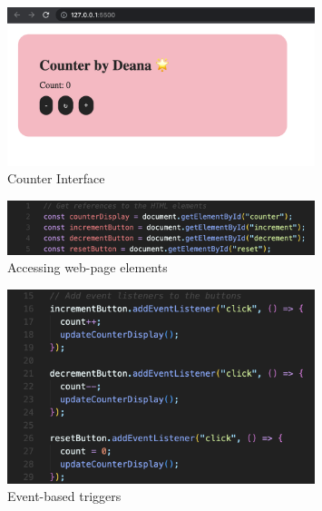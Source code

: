 \documentclass[a4paper, 11pt]{report}
\begin{document}
\begin{figure}[ht]
    \centering
    \includegraphics[width=0.8\textwidth]{Images/counter1.png}
    \caption{Counter Interface}
    \label{fig:screenshot}
\end{figure}

\begin{figure}[ht]
    \centering
    \includegraphics[width=0.8\textwidth]{Images/counter2.png}
    \caption{Accessing web-page elements}
    \label{fig:screenshot}
\end{figure}

\begin{figure}[ht]
    \centering
    \includegraphics[width=0.8\textwidth]{Images/counter3.png}
    \caption{Event-based triggers}
    \label{fig:screenshot}
\end{figure}


\newpage



\end{document}

